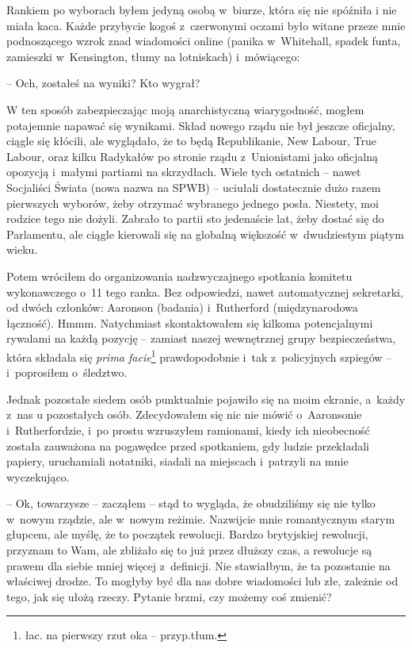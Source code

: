 \documentclass[oneside,polish,11pt,sfheadings]{mwbk}
\begin{document}
Rankiem po wyborach byłem jedyną osobą w~biurze, która się nie spóźniła
i nie miała kaca. Każde przybycie kogoś z~czerwonymi oczami było witane przeze
mnie podnoszącego wzrok znad wiadomości online (panika w~Whitehall,
spadek funta, zamieszki w~Kensington, tłumy na lotniskach) i~mówiącego:

-- Och, zostałeś na wyniki? Kto wygrał?

W ten sposób zabezpieczając moją anarchistyczną wiarygodność, mogłem
potajemnie napawać się wynikami. Skład nowego rządu nie był jeszcze
oficjalny, ciągle się kłócili, ale wyglądało, że to będą Republikanie,
New Labour, True Labour, oraz kilku Radykałów po stronie rządu z~Unionistami jako oficjalną opozycją i~małymi partiami na skrzydłach.
Wiele tych ostatnich -- nawet Socjaliści Świata (nowa nazwa na SPWB) -- uciułali dostatecznie dużo razem pierwszych wyborów, żeby otrzymać
wybranego jednego posła. Niestety, moi rodzice tego nie dożyli. Zabrało
to partii sto jedenaście lat, żeby dostać się do Parlamentu, ale ciągle
kierowali się na globalną większość w~dwudziestym piątym wieku.

Potem wróciłem do organizowania nadzwyczajnego spotkania komitetu
wykonawczego o~11 tego ranka. Bez odpowiedzi, nawet automatycznej
sekretarki, od dwóch członków: Aaronson (badania) i~Rutherford
(międzynarodowa łączność). Hmmm. Natychmiast skontaktowałem się kilkoma
potencjalnymi rywalami na każdą pozycję -- zamiast naszej wewnętrznej
grupy bezpieczeństwa, która składała się \emph{prima facie}\footnote{łac. na
pierwszy rzut oka -- przyp.tłum.} prawdopodobnie i~tak z~policyjnych
szpiegów -- i~poprosiłem o~śledztwo.

Jednak pozostałe siedem osób punktualnie pojawiło się na moim ekranie, a~każdy z~nas u pozostałych osób. Zdecydowałem się nic nie mówić o~Aaronsonie i~Rutherfordzie, i~po prostu wzruszyłem ramionami, kiedy ich
nieobecność została zauważona na pogawędce przed spotkaniem, gdy ludzie
przekładali papiery, uruchamiali notatniki, siadali na miejscach i~patrzyli na mnie wyczekująco.

-- Ok, towarzysze -- zacząłem -- stąd to wygląda, że obudziliśmy się nie
tylko w~nowym rządzie, ale w~nowym reżimie. Nazwijcie mnie romantycznym
starym głupcem, ale myślę, że to początek rewolucji. Bardzo brytyjskiej
rewolucji, przyznam to Wam, ale zbliżało się to już przez dłuższy czas,
a rewolucje są prawem dla siebie mniej więcej z~definicji. Nie
stawiałbym, że ta pozostanie na właściwej drodze. To mogłyby być dla nas
dobre wiadomości lub złe, zależnie od tego, jak się ułożą rzeczy.
Pytanie brzmi, czy możemy coś zmienić?
\end{document}
